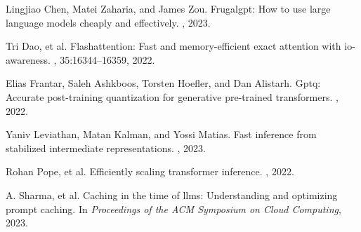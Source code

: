 \documentclass[11pt]{article}
\begin{document}

\begin{thebibliography}{1}

Lingjiao Chen, Matei Zaharia, and James Zou.
\newblock Frugalgpt: How to use large language models cheaply and effectively.
, 2023.

Tri Dao, et al.
\newblock Flashattention: Fast and memory-efficient exact attention with io-awareness.
, 35:16344--16359, 2022.

Elias Frantar, Saleh Ashkboos, Torsten Hoefler, and Dan Alistarh.
\newblock Gptq: Accurate post-training quantization for generative pre-trained transformers.
, 2022.

Yaniv Leviathan, Matan Kalman, and Yossi Matias.
\newblock Fast inference from stabilized intermediate representations.
, 2023.

Rohan Pope, et al.
\newblock Efficiently scaling transformer inference.
, 2022.

A. Sharma, et al.
\newblock Caching in the time of llms: Understanding and optimizing prompt caching.
\newblock In {\em Proceedings of the ACM Symposium on Cloud Computing}, 2023.

\end{thebibliography}
\end{document}
